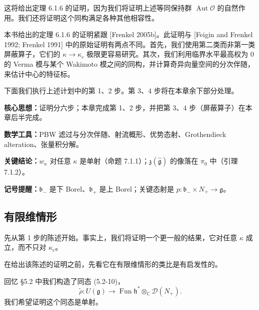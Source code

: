 这将给出定理 6.1.6 的证明，因为我们将证明上述等同保持群 $\operatorname{Aut}\mathcal{O}$ 的自然作用。我们还将证明这个同构满足各种其他相容性。

本书给出的定理 6.1.6 的证明紧跟 [Frenkel 2005b]。此证明与 [Feigin and Frenkel 1992; Frenkel 1991] 中的原始证明有两点不同。首先，我们使用第二类而非第一类屏蔽算子，它们的 $\kappa\to\kappa_c$ 极限更容易研究。其次，我们利用临界水平最高权为 $0$ 的 Verma 模与某个 Wakimoto 模之间的同构，并计算奇异向量空间的分次伴随，来估计中心的特征标。

下面我们执行上述计划中的第 1、2 步。第 3、4 步将在本章余下部分处理。


\begin{keypoints}
    \item \textbf{核心思想：}证明分六步；本章完成第 1、2 步，并把第 3、4 步（屏蔽算子）在本章后半完成。
    \item \textbf{数学工具：}PBW 滤过与分次伴随、射流概形、优势态射、Grothendieck alteration、张量积分解。
    \item \textbf{关键结论：}$w_\kappa$ 对任意 $\kappa$ 是单射（命题 7.1.1）；$\mathfrak{z}(\hat{\mathfrak{g}})$ 的像落在 $\pi_0$ 中（引理 7.1.2）。
    \item \textbf{记号提醒：}$\mathfrak{b}_-$ 是下 Borel、$\mathfrak{b}_+$ 是上 Borel；关键态射是 $p:\mathfrak{b}_-\times N_+\to\mathfrak{g}$。
\end{keypoints}

\subsection{有限维情形}

先从第 1 步的陈述开始。事实上，我们将证明一个更一般的结果，它对任意 $\kappa$ 成立，而不只对 $\kappa_c$。

在给出该陈述的证明之前，先看它在有限维情形的类比是有启发性的。

回忆 §5.2 中我们构造了同态 (5.2-10)，
\begin{equation}
    \widetilde{\rho}:U(\mathfrak{g})\longrightarrow\operatorname{Fun}\mathfrak{h}^*\otimes_{\mathbb{C}}\mathcal{D}(N_+).
    \tag{7.1-2}
\end{equation}
我们希望证明这个同态是单射。

